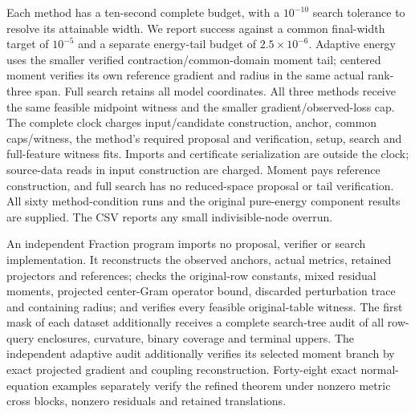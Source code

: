 Each method has a ten-second complete budget, with a $10^{-10}$ search tolerance to resolve its attainable width. We report success against a common final-width target of $10^{-5}$ and a separate energy-tail budget of $2.5\times10^{-6}$. Adaptive energy uses the smaller verified contraction/common-domain moment tail; centered moment verifies its own reference gradient and radius in the same actual rank-three span. Full search retains all model coordinates. All three methods receive the same feasible midpoint witness and the smaller gradient/observed-loss cap. The complete clock charges input/candidate construction, anchor, common caps/witness, the method's required proposal and verification, setup, search and full-feature witness fits. Imports and certificate serialization are outside the clock; source-data reads in input construction are charged. Moment pays reference construction, and full search has no reduced-space proposal or tail verification. All sixty method-condition runs and the original pure-energy component results are supplied. The CSV reports any small indivisible-node overrun.

An independent Fraction program imports no proposal, verifier or search implementation. It reconstructs the observed anchors, actual metrics, retained projectors and references; checks the original-row constants, mixed residual moments, projected center-Gram operator bound, discarded perturbation trace and containing radius; and verifies every feasible original-table witness. The first mask of each dataset additionally receives a complete search-tree audit of all row-query enclosures, curvature, binary coverage and terminal uppers. The independent adaptive audit additionally verifies its selected moment branch by exact projected gradient and coupling reconstruction. Forty-eight exact normal-equation examples separately verify the refined theorem under nonzero metric cross blocks, nonzero residuals and retained translations.




